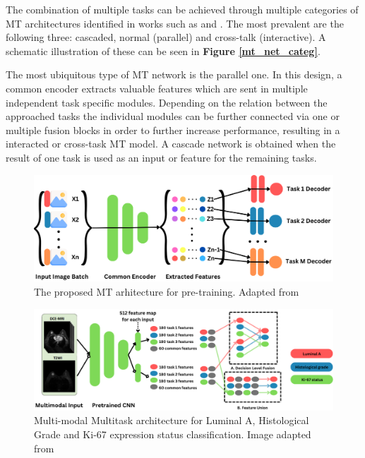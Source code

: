 \documentclass[conference]{IEEEtran}
\begin{document}
The combination of multiple tasks can be achieved through multiple categories of MT architectures identified in works such as \cite{crawshaw2020multi} and \cite{zhao2023multi}. The most prevalent are the following three: cascaded, normal (parallel) and cross-talk (interactive). A schematic illustration of these can be seen in \textbf{Figure \ref{mt_net_categ}}.

The most ubiquitous type of MT network is the parallel one. In this design, a common encoder extracts valuable features which are sent in multiple independent task specific modules. Depending on the relation between the approached tasks the individual modules can be further connected via one or multiple fusion blocks in  order to further increase performance, resulting in a interacted or cross-task MT model. A cascade network is obtained when the result of one task is used as an input or feature for the remaining tasks.

\begin{figure}[htb]
    \centering
	\centerline{\includegraphics[scale=0.28]{figures/mt_pretraining_V2.png}}
	\caption{The proposed MT arhitecture for pre-training. Adapted from \cite{mormont2020multi}}
	\label{mt_pretaining}
\end{figure}

\begin{figure}[htb]
    \centering
	\centerline{\includegraphics[scale=0.5]{figures/multimodal_multitask_V2.png}}
	\caption{Multi-modal Multitask architecture for Luminal A, Histological Grade and Ki-67 expression status classification. Image adapted from \cite{fan2022framework}}
	\label{multimodal_multitask}
\end{figure}
\end{document}
